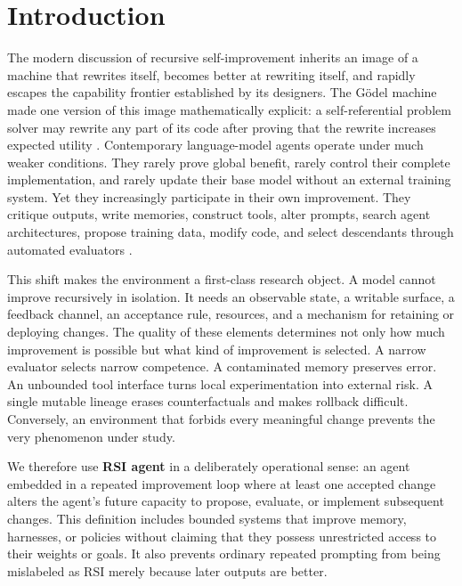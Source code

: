 \documentclass[11pt,a4paper]{article}
\newcommand{\term}[1]{\textbf{#1}}
\begin{document}
\tableofcontents
\clearpage

\section{Introduction}

The modern discussion of recursive self-improvement inherits an image of a machine that rewrites itself, becomes better at rewriting itself, and rapidly escapes the capability frontier established by its designers. The G\"odel machine made one version of this image mathematically explicit: a self-referential problem solver may rewrite any part of its code after proving that the rewrite increases expected utility \cite{schmidhuber}. Contemporary language-model agents operate under much weaker conditions. They rarely prove global benefit, rarely control their complete implementation, and rarely update their base model without an external training system. Yet they increasingly participate in their own improvement. They critique outputs, write memories, construct tools, alter prompts, search agent architectures, propose training data, modify code, and select descendants through automated evaluators \cite{selfrefine,reflexion,stop,adas,dgm,seal}.

This shift makes the environment a first-class research object. A model cannot improve recursively in isolation. It needs an observable state, a writable surface, a feedback channel, an acceptance rule, resources, and a mechanism for retaining or deploying changes. The quality of these elements determines not only how much improvement is possible but what kind of improvement is selected. A narrow evaluator selects narrow competence. A contaminated memory preserves error. An unbounded tool interface turns local experimentation into external risk. A single mutable lineage erases counterfactuals and makes rollback difficult. Conversely, an environment that forbids every meaningful change prevents the very phenomenon under study.

We therefore use \term{RSI agent} in a deliberately operational sense: an agent embedded in a repeated improvement loop where at least one accepted change alters the agent's future capacity to propose, evaluate, or implement subsequent changes. This definition includes bounded systems that improve memory, harnesses, or policies without claiming that they possess unrestricted access to their weights or goals. It also prevents ordinary repeated prompting from being mislabeled as RSI merely because later outputs are better.
\end{document}
